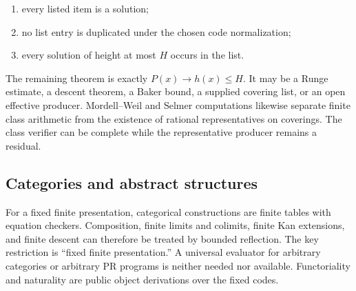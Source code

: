 \begin{enumerate}[label=(\roman*)]
\item every listed item is a solution;
\item no list entry is duplicated under the chosen code normalization;
\item every solution of height at most \(H\) occurs in the list.
\end{enumerate}

The remaining theorem is exactly
\(P(x)\to h(x)\le H\).  It may be a Runge estimate, a descent theorem, a Baker
bound, a supplied covering list, or an open effective producer.  Mordell--Weil
and Selmer computations likewise separate finite class arithmetic from the
existence of rational representatives on coverings.  The class verifier can
be complete while the representative producer remains a residual.

\subsection{Categories and abstract structures}

For a fixed finite presentation, categorical constructions are finite tables
with equation checkers.  Composition, finite limits and colimits, finite Kan
extensions, and finite descent can therefore be treated by bounded reflection.
The key restriction is ``fixed finite presentation.''  A universal evaluator
for arbitrary categories or arbitrary PR programs is neither needed nor
available.  Functoriality and naturality are public object derivations over the
fixed codes.
